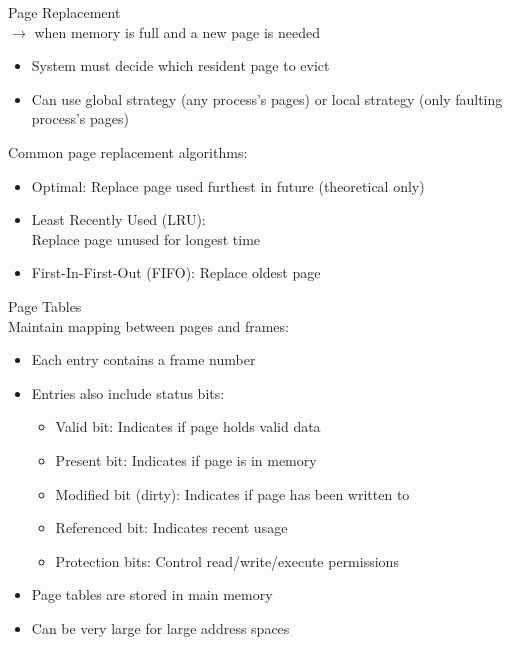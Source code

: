 \begin{concept}{Page Replacement}\\
    $\rightarrow$ when memory is full and a new page is needed
    \begin{itemize}
        \item System must decide which resident page to evict
        \item Can use global strategy (any process's pages) or local strategy (only faulting process's pages)
    \end{itemize}
        Common page replacement algorithms:
            \begin{itemize}
                \item Optimal: Replace page used furthest in future (theoretical only)
                \item Least Recently Used (LRU): \\ Replace page unused for longest time
                \item First-In-First-Out (FIFO): Replace oldest page
            \end{itemize}
\end{concept}

\begin{theorem}{Page Tables} \\ Maintain mapping between pages and frames:
    \begin{itemize}
        \item Each entry contains a frame number
        \item Entries also include status bits:
            \begin{itemize}
                \item Valid bit: Indicates if page holds valid data
                \item Present bit: Indicates if page is in memory
                \item Modified bit (dirty): Indicates if page has been written to
                \item Referenced bit: Indicates recent usage
                \item Protection bits: Control read/write/execute permissions
            \end{itemize}
        \item Page tables are stored in main memory
        \item Can be very large for large address spaces
    \end{itemize}
\end{theorem}

